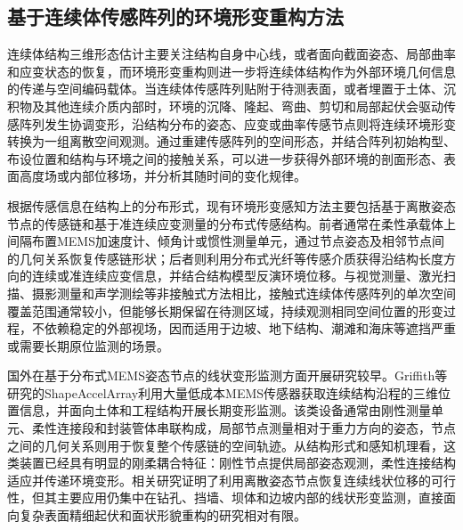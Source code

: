 \subsection{基于连续体传感阵列的环境形变重构方法}
连续体结构三维形态估计主要关注结构自身中心线，或者面向截面姿态、局部曲率和应变状态的恢复，而环境形变重构则进一步将连续体结构作为外部环境几何信息的传递与空间编码载体。当连续体传感阵列贴附于待测表面，或者埋置于土体、沉积物及其他连续介质内部时，环境的沉降、隆起、弯曲、剪切和局部起伏会驱动传感阵列发生协调变形，沿结构分布的姿态、应变或曲率传感节点则将连续环境形变转换为一组离散空间观测。通过重建传感阵列的空间形态，并结合阵列初始构型、布设位置和结构与环境之间的接触关系，可以进一步获得外部环境的剖面形态、表面高度场或内部位移场，并分析其随时间的变化规律。

根据传感信息在结构上的分布形式，现有环境形变感知方法主要包括基于离散姿态节点的传感链和基于准连续应变测量的分布式传感结构。前者通常在柔性承载体上间隔布置MEMS加速度计、倾角计或惯性测量单元，通过节点姿态及相邻节点间的几何关系恢复传感链形状；后者则利用分布式光纤等传感介质获得沿结构长度方向的连续或准连续应变信息，并结合结构模型反演环境位移。与视觉测量、激光扫描、摄影测量和声学测绘等非接触式方法相比，接触式连续体传感阵列的单次空间覆盖范围通常较小，但能够长期保留在待测区域，持续观测相同空间位置的形变过程，不依赖稳定的外部视场，因而适用于边坡、地下结构、潮滩和海床等遮挡严重或需要长期原位监测的场景。

国外在基于分布式MEMS姿态节点的线状变形监测方面开展研究较早。Griffith等研究的ShapeAccelArray利用大量低成本MEMS传感器获取连续结构沿程的三维位置信息，并面向土体和工程结构开展长期变形监测\cite{griffith2010shapeaccelarray}。该类设备通常由刚性测量单元、柔性连接段和封装管体串联构成，局部节点测量相对于重力方向的姿态，节点之间的几何关系则用于恢复整个传感链的空间轨迹。从结构形式和感知机理看，这类装置已经具有明显的刚柔耦合特征：刚性节点提供局部姿态观测，柔性连接结构适应并传递环境变形。相关研究证明了利用离散姿态节点恢复连续线状位移的可行性，但其主要应用仍集中在钻孔、挡墙、坝体和边坡内部的线状形变监测，直接面向复杂表面精细起伏和面状形貌重构的研究相对有限。

